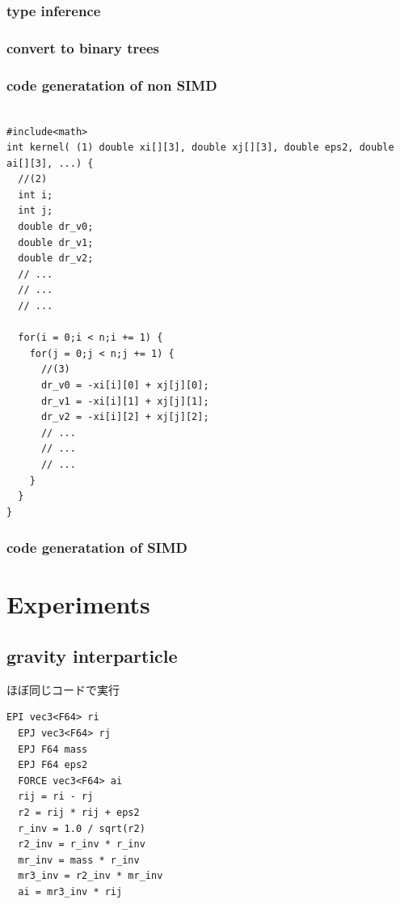 \documentclass[ams, a4j]{U-AizuGT}
\begin{document}
\subsubsection{type inference}
\subsubsection{convert to binary trees}

\subsubsection{code generatation of non SIMD}

\begin{lstlisting}[frame=single, caption=hoge]

#include<math>
int kernel( (1) double xi[][3], double xj[][3], double eps2, double ai[][3], ...) {
  //(2)
  int i;
  int j;
  double dr_v0;
  double dr_v1;
  double dr_v2;
  // ... 
  // ... 
  // ... 

  for(i = 0;i < n;i += 1) {
    for(j = 0;j < n;j += 1) {
      //(3)
      dr_v0 = -xi[i][0] + xj[j][0];
      dr_v1 = -xi[i][1] + xj[j][1];
      dr_v2 = -xi[i][2] + xj[j][2];
      // ... 
      // ... 
      // ... 
    }
  }
}
\end{lstlisting}
  

\subsubsection{code generatation of SIMD}





\section{Experiments}

\subsection{gravity interparticle}
ほぼ同じコードで実行


\begin{lstlisting}[frame=single, caption=Nbody-kernel.pyker, label=Nbody-kernel.pyker]
  EPI vec3<F64> ri
  EPJ vec3<F64> rj
  EPJ F64 mass
  EPJ F64 eps2
  FORCE vec3<F64> ai
  rij = ri - rj
  r2 = rij * rij + eps2
  r_inv = 1.0 / sqrt(r2)
  r2_inv = r_inv * r_inv
  mr_inv = mass * r_inv
  mr3_inv = r2_inv * mr_inv
  ai = mr3_inv * rij
  \end{lstlisting}
\end{document}
